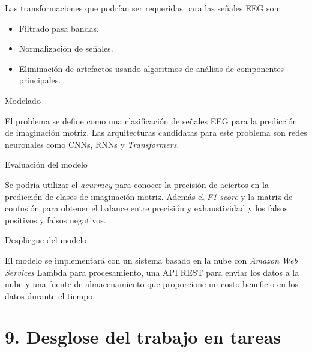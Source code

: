 \documentclass[
11pt, %
]{charter}
\begin{document}
Las transformaciones que podrían ser requeridas para las señales EEG son:
\begin{itemize}
	\item Filtrado pasa bandas.
	\item Normalización de señales.
	\item Eliminación de artefactos usando algoritmos de análisis de componentes principales.
\end{itemize}

Modelado

El problema se define como una clasificación de señales EEG para la predicción de imaginación motriz.
Las arquitecturas candidatas para este problema son redes neuronales como CNNs, RNNs y \textit{Transformers}.

Evaluación del modelo

Se podría utilizar el \textit{acurracy} para conocer la precisión de aciertos en la predicción de clases de imaginación motriz. Además el \textit{F1-score} y la matriz de confusión para obtener
el balance entre precisión y exhaustividad y los falsos positivos y falsos negativos. 

Despliegue del modelo

El modelo se implementará con un sistema basado en la nube con \textit{Amazon Web Services} Lambda para procesamiento, una API REST para enviar los datos a la nube y una fuente
de almacenamiento que proporcione un costo beneficio en los datos durante el tiempo.

\section{9. Desglose del trabajo en tareas}
\label{sec:wbs}
\end{document}
